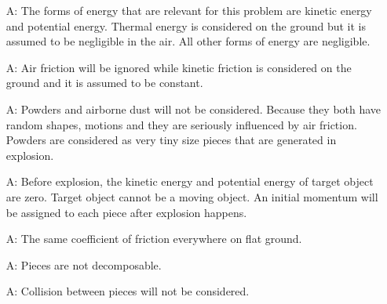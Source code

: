 \documentclass[12pt]{article}
\newcounter{assumpnum} %
\begin{document}
	\begin{itemize}
		
		\item[A\refstepcounter{assumpnum}\theassumpnum \label{A_mechanical}:]
		The forms of energy that are relevant for this problem are kinetic energy and potential energy. Thermal energy is considered on the ground but it is assumed to be negligible in the air. All other forms of energy are negligible. 
		
		\item[A\refstepcounter{assumpnum}\theassumpnum \label{A_airFriction}:]
		Air friction will be ignored while kinetic friction is considered on the ground and it is assumed to be constant.
		
		\item[A\refstepcounter{assumpnum}\theassumpnum \label{A_powder}:]
		Powders and airborne  dust will not be considered. Because they both have random shapes, motions and they are seriously influenced by air friction. Powders are considered as very tiny size pieces that are generated in explosion.
		 
		
		\item[A\refstepcounter{assumpnum}\theassumpnum \label{A_initialPE}:]
	Before explosion, the kinetic energy and potential energy of target object are zero. Target object cannot be a moving object. An initial momentum will be assigned to each piece after explosion happens. 
		
		\item[A\refstepcounter{assumpnum}\theassumpnum \label{A_ground}:]
		The same coefficient of friction everywhere on flat ground.​
		
		\item[A\refstepcounter{assumpnum}\theassumpnum \label{A_piece}:]
		Pieces are not decomposable. 
		
		\item[A\refstepcounter{assumpnum}\theassumpnum \label{A_collision}:]
		Collision between pieces will not be considered. 
		
	\end{itemize}
	
\end{document}
